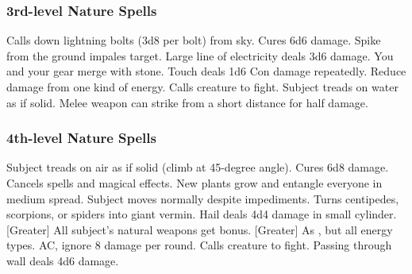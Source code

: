 \subsubsection{3rd-level Nature Spells}
\begin{spelllist}
     Calls down lightning bolts (3d8 per bolt) from sky.
     Cures 6d6 damage.
     Spike from the ground impales target.
     Large line of electricity deals 3d6 damage.
     You and your gear merge with stone.
     Touch deals 1d6 Con damage repeatedly.
     Reduce damage from one kind of energy.
     Calls creature to fight.
     Subject treads on water as if solid.
     Melee weapon can strike from a short distance for half damage.
\end{spelllist}

\subsubsection{4th-level Nature Spells}
\begin{spelllist}
     Subject treads on air as if solid (climb at 45-degree angle).
     Cures 6d8 damage.
     Cancels spells and magical effects.
     New plants grow and entangle everyone in medium spread.
     Subject moves normally despite impediments.
     Turns centipedes, scorpions, or spiders into giant vermin.
     Hail deals 4d4 damage in small cylinder.
    [Greater] All subject's natural weapons get  bonus.
    [Greater] As , but all energy types.
      AC, ignore 8 damage per round.
     Calls creature to fight.
     Passing through wall deals 4d6 damage.
\end{spelllist}

